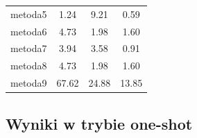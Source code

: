 \begin{table}[H]
\begin{tabular}{lccc}
		metoda5           & 1.24          & 9.21             & 0.59           \\
		metoda6           & 4.73          & 1.98             & 1.60           \\
		metoda7           & 3.94          & 3.58             & 0.91           \\
		metoda8           & 4.73          & 1.98             & 1.60           \\
		metoda9           & 67.62         & 24.88            & 13.85          \\
		\bottomrule
	\end{tabular}
\end{table}

\subsection{Wyniki w trybie one-shot}
